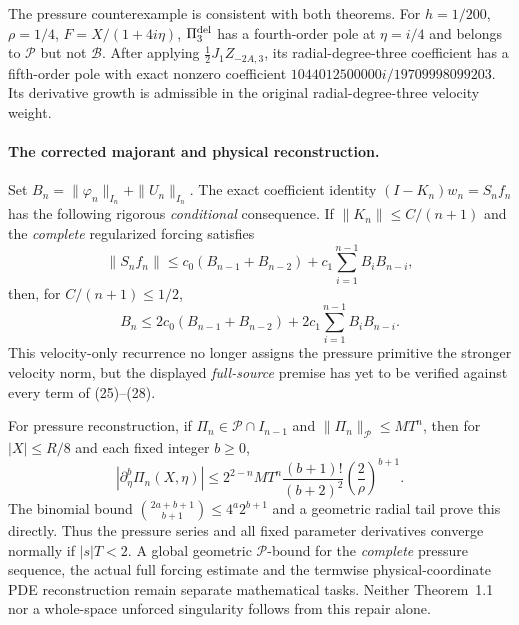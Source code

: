 The pressure counterexample is consistent with both theorems.
For $h=1/200$, $\rho=1/4$, $F=X/(1+4i\eta)$,
$\Pi_3^{\rm del}$ has a fourth-order pole at $\eta=i/4$
and belongs to $\mathcal P$ but not $\mathcal B$.
After applying $\frac12J_1Z_{-2A,3}$, its radial-degree-three
coefficient has a fifth-order pole with exact nonzero
coefficient $1044012500000i/19709998099203$. Its derivative
growth is admissible in the original radial-degree-three
velocity weight.

\paragraph{The corrected majorant and physical reconstruction.}
Set $B_n=\|\varphi_n\|_{I_n}+\|U_n\|_{I_n}$.
The exact coefficient identity $(I-K_n)w_n=S_nf_n$ has the
following rigorous \emph{conditional} consequence. If
$\|K_n\|\le C/(n+1)$ and the \emph{complete} regularized
forcing satisfies
\[
\|S_nf_n\|\le c_0(B_{n-1}+B_{n-2})
+c_1\sum_{i=1}^{n-1}B_iB_{n-i},
\]
then, for $C/(n+1)\le1/2$,
\begin{equation}\label{eq:corrected-velocity-recurrence}
B_n\le2c_0(B_{n-1}+B_{n-2})
+2c_1\sum_{i=1}^{n-1}B_iB_{n-i}.
\end{equation}
This velocity-only recurrence no longer assigns the pressure
primitive the stronger velocity norm, but the displayed
\emph{full-source} premise has yet to be verified against
every term of (25)--(28).

For pressure reconstruction, if
$\Pi_n\in\mathcal P\cap I_{n-1}$ and
$\|\Pi_n\|_{\mathcal P}\le MT^n$, then for $|X|\le R/8$
and each fixed integer $b\ge0$,
\begin{equation}\label{eq:P-derivative-sum}
|\partial_\eta^b\Pi_n(X,\eta)|
\le 2^{2-n}MT^n\frac{(b+1)!}{(b+2)^2}
\left(\frac2\rho\right)^{b+1}.
\end{equation}
The binomial bound
$\binom{2a+b+1}{b+1}\le4^a2^{b+1}$
and a geometric radial tail prove this directly.
Thus the pressure series and all fixed parameter derivatives
converge normally if $|s|T<2$.
A global geometric $\mathcal P$-bound for the \emph{complete}
pressure sequence, the actual full forcing estimate and the
termwise physical-coordinate PDE reconstruction remain
separate mathematical tasks. Neither Theorem~1.1 nor a
whole-space unforced singularity follows from this repair alone.


